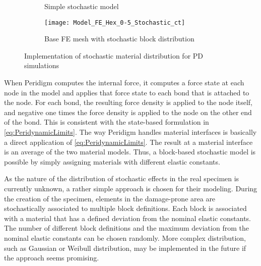 \begin{figure}[htbp]
  \setlength{\figheight}{5cm}
  \begin{subfigure}{0.49\linewidth}
    \begin{minipage}[b][\figheight]{\linewidth}
      \centering
      \def\nb{20}
      \def\ne{10}
      
    \end{minipage}
    \caption{Simple stochastic model}
    \label{fig:Thry:Stochastic:Distribution}
  \end{subfigure}
  \hfill
  \begin{subfigure}{0.49\linewidth}
    \begin{minipage}[b][\figheight]{\linewidth}
      \texttt{[image: Model\_FE\_Hex\_0-5\_Stochastic\_ct]}
    \end{minipage}
    \caption{Base FE mesh with stochastic block distribution}
    \label{fig:Thry:Stochastic:FEModel}
  \end{subfigure}
  \caption{Implementation of stochastic material distribution for PD simulations}
  \label{fig:Thry:Stochastic:Implementation}
\end{figure}

When Peridigm computes the internal force, it computes a force state at each node in the model and applies that force state to each bond that is attached to the node. For each bond, the resulting force density is applied to the node itself, and negative one times the force density is applied to the node on the other end of the bond.  This is consistent with the state-based formulation in \autoref{eq:PeridynamicLimits}. The way Peridigm handles material interfaces is basically a direct application of \autoref{eq:PeridynamicLimits}. The result at a material interface is an average of the two material models. Thus, a block-based stochastic model is possible by simply assigning materials with different elastic constants.

As the nature of the distribution of stochastic effects in the real specimen is currently unknown, a rather simple approach is chosen for their modeling. During the creation of the specimen, elements in the damage-prone area are stochastically associated to multiple block definitions. Each block is associated with a material that has a defined deviation from the nominal elastic constants. The number of different block definitions and the maximum deviation from the nominal elastic constants can be chosen randomly. More complex distribution, such as Gaussian or Weibull distribution, may be implemented in the future if the approach seems promising.

